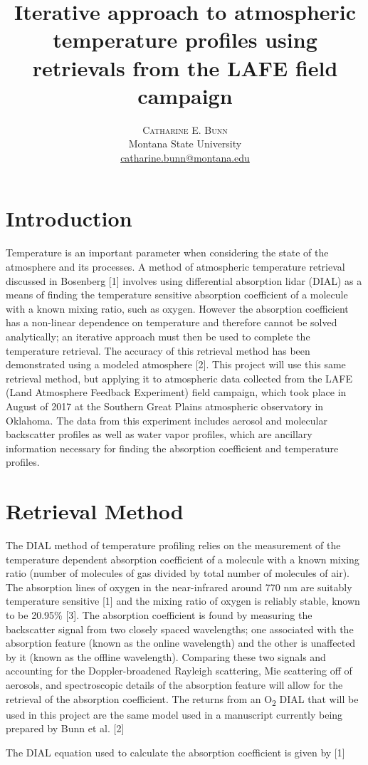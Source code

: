 \documentclass[twoside]{article}
\title{\vspace{-15mm}\fontsize{22pt}{10pt}\selectfont\textbf{Iterative approach to atmospheric temperature profiles using retrievals from the LAFE field campaign}} %
\author{
\large
\textsc{Catharine E. Bunn}\\[2mm] %
\normalsize Montana State University \\ %
\normalsize \href{mailto:catharine.bunn@montana.edu}{catharine.bunn@montana.edu} %
\vspace{-5mm}
}
\date{}
\begin{document}
\maketitle %

\thispagestyle{fancy} %



\section{Introduction}
Temperature is an important parameter when considering the state of the atmosphere and its processes. A method of atmospheric temperature retrieval discussed in Bosenberg [1] involves using differential absorption lidar (DIAL) as a means of finding the temperature sensitive absorption coefficient of a molecule with a known mixing ratio, such as oxygen. However the absorption coefficient has a non-linear dependence on temperature and therefore cannot be solved analytically; an iterative approach must then be used to complete the temperature retrieval. The accuracy of this retrieval method has been demonstrated using a modeled atmosphere [2]. This project will use this same retrieval method, but applying it to atmospheric data collected from the LAFE (Land Atmosphere Feedback Experiment) field campaign, which took place in August of 2017 at the Southern Great Plains atmospheric observatory in Oklahoma. The data from this experiment includes aerosol and molecular backscatter profiles as well as water vapor profiles, which are ancillary information necessary for finding the absorption coefficient and temperature profiles.

\section{Retrieval Method}
The DIAL method of temperature profiling relies on the measurement of the temperature dependent absorption coefficient of a molecule with a known mixing ratio (number of molecules of gas divided by total number of molecules of air). The absorption lines of oxygen in the near-infrared around 770 nm are suitably temperature sensitive [1] and the mixing ratio of oxygen is reliably stable, known to be 20.95\% [3]. The absorption coefficient is found by measuring the backscatter signal from two closely spaced wavelengths; one associated with the absorption feature (known as the online wavelength) and the other is unaffected by it (known as the offline wavelength). Comparing these two signals and accounting for the Doppler-broadened Rayleigh scattering, Mie scattering off of aerosols, and spectroscopic details of the absorption feature will allow for the retrieval of the absorption coefficient. The returns from an O\textsubscript{2} DIAL that will be used in this project are the same model used in a manuscript currently being prepared by Bunn et al. [2]\\
\par
\noindent The DIAL equation used to calculate the absorption coefficient is given by [1]
\end{document}
